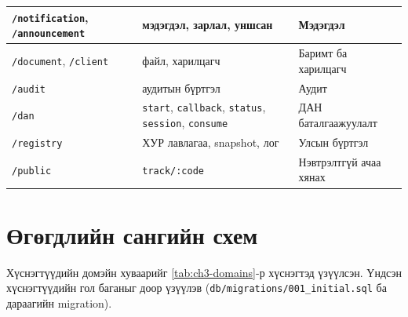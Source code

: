 \documentclass[
12pt,
oneside,
english,
onehalfspacing,
nolistspacing,
headsepline,
]{MUST-Thesis}
\begin{document}
{\begin{longtable}{|L{3.8cm}|L{4.6cm}|L{5.4cm}|}
\texttt{/notification}, \texttt{/announcement} & мэдэгдэл, зарлал, уншсан & Мэдэгдэл \\ \hline
\texttt{/document}, \texttt{/client} & файл, харилцагч & Баримт ба харилцагч \\ \hline
\texttt{/audit} & аудитын бүртгэл & Аудит \\ \hline
\texttt{/dan} & \texttt{start}, \texttt{callback}, \texttt{status}, \texttt{session}, \texttt{consume} & ДАН баталгаажуулалт \\ \hline
\texttt{/registry} & ХУР лавлагаа, snapshot, лог & Улсын бүртгэл \\ \hline
\texttt{/public} & \texttt{track/:code} & Нэвтрэлтгүй ачаа хянах \\ \hline
\end{longtable}
}

\section{Өгөгдлийн сангийн схем}\label{app:schema}

Хүснэгтүүдийн домэйн хуваарийг \ref{tab:ch3-domains}-р хүснэгтэд үзүүлсэн. Үндсэн хүснэгтүүдийн гол баганыг доор үзүүлэв (\texttt{db/migrations/001\_initial.sql} ба дараагийн migration).
\end{document}
